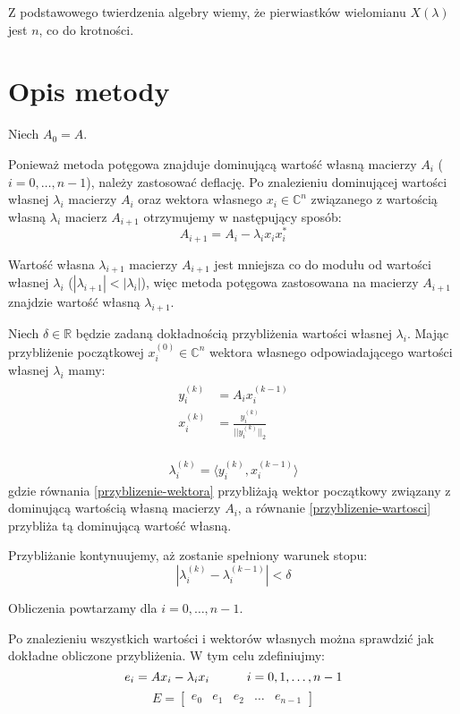 \documentclass[12pt]{article}
\begin{document}
	Z podstawowego twierdzenia algebry wiemy, że pierwiastków wielomianu $X(\lambda)$ jest $n$, co do krotności.
	
	
	\section{Opis metody}
	Niech $A_0 = A$.
	
	Ponieważ metoda potęgowa znajduje dominującą wartość własną macierzy $A_i$ ($i = 0, \dots, n-1$), należy zastosować deflację. Po znalezieniu dominującej wartości własnej $\lambda_i$ macierzy $A_i$ oraz wektora własnego $x_i \in \mathbb{C}^n$ związanego z wartością własną $\lambda_i$ macierz $A_{i+1}$ otrzymujemy w następujący sposób:
	$$ A_{i+1} = A_i - \lambda_i x_i x_i^* $$
	
	Wartość własna $\lambda_{i+1}$ macierzy $A_{i+1}$ jest mniejsza co do modułu od wartości własnej $\lambda_i$ ($|\lambda_{i+1}| < |\lambda_i|$), więc metoda potęgowa zastosowana na macierzy $A_{i+1}$ znajdzie wartość własną $\lambda_{i+1}$.
	
	Niech $\delta \in \mathbb{R}$ będzie zadaną dokładnością przybliżenia wartości własnej $\lambda_i$. Mając przybliżenie początkowej $x_i^{(0)} \in \mathbb{C}^n$ wektora własnego odpowiadającego wartości własnej $\lambda_i$ mamy:
	\begin{align}
		\begin{split}
			\label{przyblizenie-wektora}
			y_i^{(k)}       & = A_i x_i^{(k-1)} \\
			x_i^{(k)}       & = \frac{y_i^{(k)}}{|| y_i^{(k)} ||_2}
		\end{split}
	\end{align}

	\begin{align}
		\label{przyblizenie-wartosci}
		\lambda_i^{(k)} = \langle y_i^{(k)}, x_i^{(k-1)} \rangle
	\end{align}
	gdzie równania \eqref{przyblizenie-wektora} przybliżają wektor początkowy związany z dominującą wartością własną macierzy $A_i$, a równanie \eqref{przyblizenie-wartosci} przybliża tą dominującą wartość własną.
	
	Przybliżanie kontynuujemy, aż zostanie spełniony warunek stopu:
	$$ | \lambda_i^{(k)} - \lambda_i^{(k-1)} | < \delta $$
	
	Obliczenia powtarzamy dla $i = 0, \dots, n-1$.
	
	Po znalezieniu wszystkich wartości i wektorów własnych można sprawdzić jak dokładne obliczone przybliżenia. W tym celu zdefiniujmy:
	$$e_i = A x_i - \lambda_i x_i \hspace{30px} i = 0, 1, \dots, n-1$$
	\begin{equation*}
		E = 
		\begin{bmatrix}
			e_0 & e_1 & e_2 & \dots & e_{n-1}
		\end{bmatrix}
	\end{equation*}
	
\end{document}
